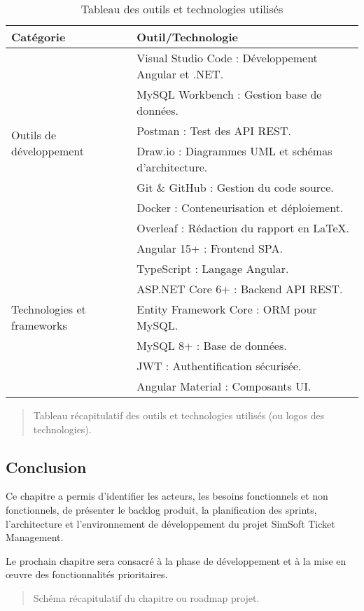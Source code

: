 \renewcommand{\arraystretch}{1.2}
\begin{table}[htbp]
    \centering
    \setlength{\tabcolsep}{6pt}
    \begin{tabular}{|p{4cm}|p{11cm}|}
        \hline
        \textbf{Catégorie} & \textbf{Outil/Technologie} \\
        \hline
        \multirow{7}{*}{Outils de développement} & Visual Studio Code : Développement Angular et .NET. \\
        \cline{2-2}
        & MySQL Workbench : Gestion base de données. \\
        \cline{2-2}
        & Postman : Test des API REST. \\
        \cline{2-2}
        & Draw.io : Diagrammes UML et schémas d'architecture. \\
        \cline{2-2}
        & Git \& GitHub : Gestion du code source. \\
        \cline{2-2}
        & Docker : Conteneurisation et déploiement. \\
        \cline{2-2}
        & Overleaf : Rédaction du rapport en LaTeX. \\
        \hline
        \multirow{7}{*}{Technologies et frameworks} & Angular 15+ : Frontend SPA. \\
        \cline{2-2}
        & TypeScript : Langage Angular. \\
        \cline{2-2}
        & ASP.NET Core 6+ : Backend API REST. \\
        \cline{2-2}
        & Entity Framework Core : ORM pour MySQL. \\
        \cline{2-2}
        & MySQL 8+ : Base de données. \\
        \cline{2-2}
        & JWT : Authentification sécurisée. \\
        \cline{2-2}
        & Angular Material : Composants UI. \\
        \hline
    \end{tabular}
    \caption{Tableau des outils et technologies utilisés}
    \label{tab:outils-technologies}
\end{table}
\renewcommand{\arraystretch}{1}

\begin{quote}
    Tableau récapitulatif des outils et technologies utilisés (ou logos des technologies).
\end{quote}

\subsection{Conclusion}
\label{sec:conclusion}
Ce chapitre a permis d'identifier les acteurs, les besoins fonctionnels et non fonctionnels, de présenter le backlog produit, la planification des sprints, l'architecture et l'environnement de développement du projet SimSoft Ticket Management.

Le prochain chapitre sera consacré à la phase de développement et à la mise en œuvre des fonctionnalités prioritaires.

\begin{quote}
    Schéma récapitulatif du chapitre ou roadmap projet.
\end{quote} 